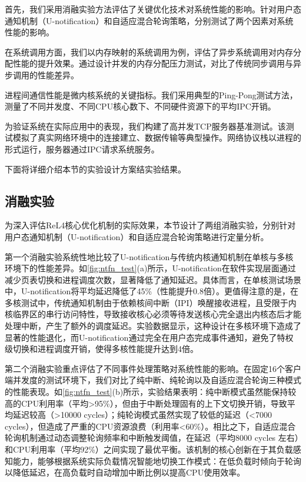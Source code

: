 首先，我们采用消融实验方法评估了关键优化技术对系统性能的影响。针对用户态通知机制（U-notification）和自适应混合轮询策略，分别测试了两个因素对系统性能的影响。

在系统调用方面，我们以内存映射的系统调用为例，评估了异步系统调用对内存分配性能的提升效果。通过设计并发的内存分配压力测试，对比了传统同步调用与异步调用的性能差异。

进程间通信性能是微内核系统的关键指标。我们采用典型的Ping-Pong测试方法，测量了不同并发度、不同CPU核心数下、不同硬件资源下的平均IPC开销。

为验证系统在实际应用中的表现，我们构建了高并发TCP服务器基准测试。该测试模拟了真实网络环境中的连接建立、数据传输等典型操作。网络协议栈以进程的形式运行，服务器通过IPC请求系统服务。

下面将详细介绍本节的实验设计方案结实验结果。

\subsection{消融实验}
为深入评估ReL4核心优化机制的实际效果，本节设计了两组消融实验，分别针对用户态通知机制（U-notification）和自适应混合轮询策略进行定量分析。

第一个消融实验系统性地比较了U-notification与传统内核通知机制在单核与多核环境下的性能差异。如\ref{fig:ntfn_test}(a)所示，U-notification在软件实现层面通过减少页表切换和进程调度次数，显著降低了通知延迟。具体而言，在单核测试场景中，U-notification将平均延迟降低了45\%（性能提升0.8倍）。更值得注意的是，在多核测试中，传统通知机制由于依赖核间中断（IPI）唤醒接收进程，且受限于内核临界区的串行访问特性，导致接收核心必须等待发送核心完全退出内核态后才能处理中断，产生了额外的调度延迟。实验数据显示，这种设计在多核环境下造成了显著的性能退化，而U-notification通过完全在用户态完成事件通知，避免了特权级切换和进程调度开销，使得多核性能提升达到4倍。

第二个消融实验重点评估了不同事件处理策略对系统性能的影响。在固定16个客户端并发度的测试环境下，我们对比了纯中断、纯轮询以及自适应混合轮询三种模式的性能表现。如\ref{fig:ntfn_test}(b)所示，实验结果表明：纯中断模式虽然能保持较高的CPU利用率（平均>95\%），但由于中断处理固有的上下文切换开销，导致平均延迟较高（>10000 cycles）；纯轮询模式虽然实现了较低的延迟（<7000 cycles），但造成了严重的CPU资源浪费（利用率<60\%）。相比之下，自适应混合轮询机制通过动态调整轮询频率和中断触发阈值，在延迟（平均8000 cycles 左右）和CPU利用率（平均92\%）之间实现了最优平衡。该机制的核心创新在于其负载感知能力，能够根据系统实际负载情况智能地切换工作模式：在低负载时倾向于轮询以降低延迟，在高负载时自动增加中断比例以提高CPU使用效率。

